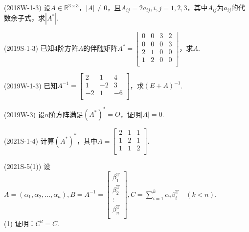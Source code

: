 \documentclass[lang=cn,newtx,10pt,scheme=chinese]{elegantbook}
\begin{document}
\begin{exercise}
    (2018W-1-3) 设$A \in \mathbb{R}^{3 \times 3}$，$\left|A\right| \neq 0$，且$A_{ij} = 2 a_{ij}, i, j = 1,2,3$，其中$A_{ij}$为$a_{ij}$的代数余子式，求$\left| A^* \right|$.
\end{exercise}

\begin{exercise}
    (2019S-1-3) 已知4阶方阵$A$的伴随矩阵$A^* = 
    \left[
    \begin{matrix}
    0 & 0 & 3 & 2 \\
    0 & 0 & 0 & 3 \\
    2 & 1 & 0 & 0 \\
    1 & 2 & 0 & 0 \\
    \end{matrix}
    \right]
    $，求$A$.
\end{exercise}

\begin{exercise}
    (2019W-1-3) 已知$A^{-1} = 
    \left[
    \begin{matrix}
        2 & 1 & 4 \\
        1 & -2 & 3 \\
        -2 & 1 & -6 \\
    \end{matrix}
    \right]
    $，求$(E+A)^{-1}$.
\end{exercise}

\begin{exercise}
    (2019W-3) 设$n$阶方阵满足$(A^*)^* = O$，证明$\left|A\right| = 0$.
\end{exercise}

\begin{exercise}
    (2021S-1-4) 计算$(A^*)^*$，其中$A = 
    \left[
    \begin{matrix}
        2 & 1 & 1 \\
        1 & 2 & 1 \\
        1 & 1 & 2 \\
    \end{matrix}
    \right]
    $.
\end{exercise}

\begin{exercise}
    (2021S-5(1)) 设$A = (\alpha_1,\alpha_2,\dots,\alpha_n),B = A^{-1} = 
    \left[
    \begin{matrix}
        \beta_1^\mathrm{T} \\
        \beta_2^\mathrm{T} \\
        \vdots \\
        \beta_n^\mathrm{T} \\
    \end{matrix}
    \right]
    , C = \sum_{i=1}^k \alpha_i \beta_i^\mathrm{T} \quad (k<n)
    $. \\
    (1) 证明：$C^2 = C$.
\end{exercise}
\end{document}
